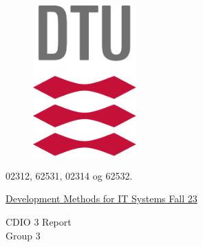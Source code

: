\documentclass{article}
\begin{document}
\begin{center}
    \begin{figure}
        \centering
        \includegraphics[width = 4cm]{Logo.png}
    \end{figure}
    \par
    02312, 62531, 02314 og 62532.
    \par
    \underline{Development Methods for IT Systems Fall 23}
\end{center}

\hrulefill

\begin{center}
    \LARGE{CDIO 3 Report} \\
    \Large{Group 3}
\end{center}

\hrulefill

\par
\end{document}
